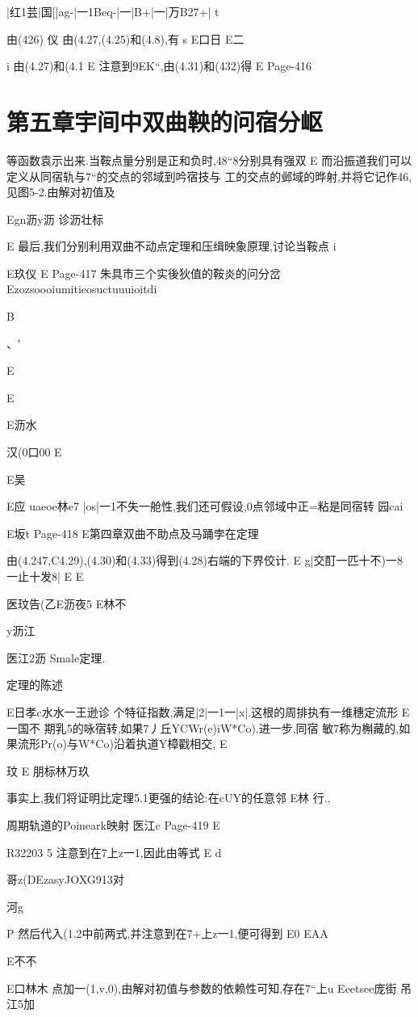 {{{{{{{{|红1芸|国[|ag-|一1Beq-|一|B+|一|万B27+|
t

由(426)
仪
由(4.27,(4.25)和(4.8),有
s
E口日
E二

i
由(4.27)和(4.1
E
注意到9EK“,由(4.31)和(432)得
E
Page-416
\part{第五章宇间中双曲鞅的问宿分岖}


等函数袁示出来.当鞍点量分别是正和负时,48“8分别具有强双
E
而沿振道我们可以定义从同宿轨与7“的交点的邻域到吟宿技与
工的交点的邺域的晔射,并将它记作46,见图5-2.由解对初值及

Egn沥y沥
诊沥壮标

E
最后,我们分别利用双曲不动点定理和压缉映象原理,讨论当鞍点
i

E玖仪
E
Page-417
朱具市三个实後狄值的鞍炎的问分岔
Ezozsoooiumitieosuctuuuioitdi

B

、′

E

E

E沥水
{汉(0口00
E

E吴

E应
uaeoe林e7
|os|一1不失一舱性,我们还可假设,0点邻域中正=粘是同宿转
园cai

E坂t
Page-418
E第四章双曲不助点及马踊孛在定理

由(4.247,C4.29),(4.30)和(4.33)得到(4.28)右端的下界佼计.
E
g|交酊一匹十不)一8一止十发8|
E
E

医玟告(乙E沥夜5
E林不

y沥江

医江2沥
Smale定理.

定理的陈述

E日孝c水水一王逊诊
个特征指数,满足|2|一1一|x|.这根的周排执有一维穗定流形
E一国不
期乳5的咏宿转,如果7丿丘YCWr(e)iW*Co).进一步,同宿
敏7称为槲藏的,如果流形Pr(o)与W*Co)沿着执道Y樟戳相交,
E

玟
E
朋标林万玖

事实上,我们将证明比定理5.1更强的结论:在cUY的任意邻
E林
行.,

周期轨道的Poineark映射
医江c
Page-419
E

R32203
5
注意到在7上z一1,因此由等式
E
d

哥z(DEzasyJOXG913对

河g

P
然后代入(1.2中前两式,并注意到在7+上z一1,便可得到
E0
EAA

E不不

E口林木
点加一(1,v,0),由解对初值与参数的依赖性可知,存在7“上u
Eeetsee庞街
吊江5加

}}}}}}}}}
